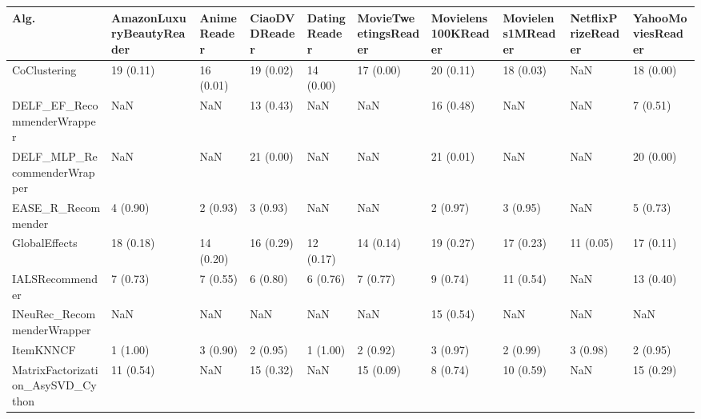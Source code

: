 \begin{tabular}{llllllllll}
\toprule
                               Alg. & AmazonLuxuryBeautyReader & AnimeReader & CiaoDVDReader & DatingReader & MovieTweetingsReader & Movielens100KReader & Movielens1MReader & NetflixPrizeReader & YahooMoviesReader \\
\midrule
                       CoClustering &                19 (0.11) &   16 (0.01) &     19 (0.02) &    14 (0.00) &            17 (0.00) &           20 (0.11) &         18 (0.03) &                NaN &         18 (0.00) \\
         DELF\_EF\_RecommenderWrapper &                      NaN &         NaN &     13 (0.43) &          NaN &                  NaN &           16 (0.48) &               NaN &                NaN &          7 (0.51) \\
        DELF\_MLP\_RecommenderWrapper &                      NaN &         NaN &     21 (0.00) &          NaN &                  NaN &           21 (0.01) &               NaN &                NaN &         20 (0.00) \\
                 EASE\_R\_Recommender &                 4 (0.90) &    2 (0.93) &      3 (0.93) &          NaN &                  NaN &            2 (0.97) &          3 (0.95) &                NaN &          5 (0.73) \\
                      GlobalEffects &                18 (0.18) &   14 (0.20) &     16 (0.29) &    12 (0.17) &            14 (0.14) &           19 (0.27) &         17 (0.23) &          11 (0.05) &         17 (0.11) \\
                    IALSRecommender &                 7 (0.73) &    7 (0.55) &      6 (0.80) &     6 (0.76) &             7 (0.77) &            9 (0.74) &         11 (0.54) &                NaN &         13 (0.40) \\
         INeuRec\_RecommenderWrapper &                      NaN &         NaN &           NaN &          NaN &                  NaN &           15 (0.54) &               NaN &                NaN &               NaN \\
                          ItemKNNCF &                 1 (1.00) &    3 (0.90) &      2 (0.95) &     1 (1.00) &             2 (0.92) &            3 (0.97) &          2 (0.99) &           3 (0.98) &          2 (0.95) \\
  MatrixFactorization\_AsySVD\_Cython &                11 (0.54) &         NaN &     15 (0.32) &          NaN &            15 (0.09) &            8 (0.74) &         10 (0.59) &                NaN &         15 (0.29) \\

\end{tabular}
